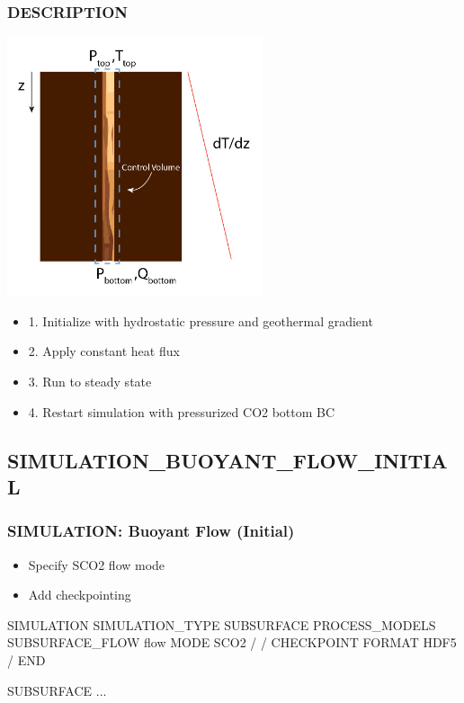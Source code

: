 \documentclass{beamer}
\begin{document}
\begin{frame}\frametitle{DESCRIPTION}

\includegraphics[height=3in]{buoyant_flow_fig.jpg}

\newpage
\begin{itemize}
  \item 1. Initialize with hydrostatic pressure and geothermal gradient
  \item 2. Apply constant heat flux
  \item 3. Run to steady state
  \item 4. Restart simulation with pressurized CO2 bottom BC
\end{itemize}

\end{frame}

\subsection{SIMULATION\_BUOYANT\_FLOW\_INITIAL}

\begin{frame}[fragile]\frametitle{SIMULATION: Buoyant Flow (Initial)}

\begin{itemize}
\item Specify SCO2 flow mode
\item Add checkpointing
\end{itemize}


\begin{semiverbatim}
SIMULATION
  SIMULATION_TYPE SUBSURFACE
  PROCESS_MODELS
    SUBSURFACE_FLOW flow
      MODE SCO2
    /
  /
CHECKPOINT
  FORMAT HDF5
/
END

SUBSURFACE
...

\end{semiverbatim}

\end{frame}
\end{document}
